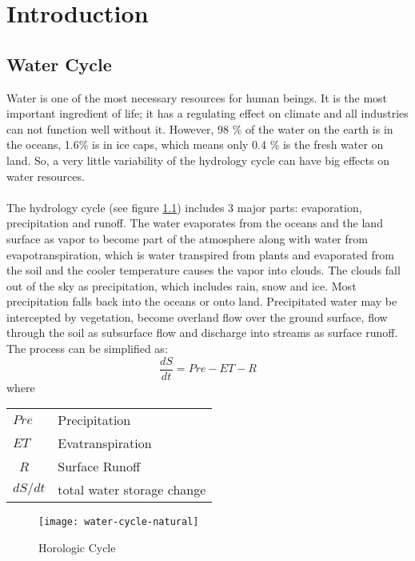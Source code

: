 \chapter{Introduction}
\section{Water Cycle}
Water is one of the most necessary resources for human beings. It is the most important ingredient of life; it has a regulating effect on climate and all industries can not function well without it. However, 98 \%
of the water on the earth is in the oceans, 1.6\% is in ice caps, which means only 0.4 \% is the
fresh water on land. So, a very little variability of the hydrology cycle can have big effects on
water resources. \\\\
The hydrology cycle (see figure \ref{fig:hydrologic cycle}) includes 3 major parts: evaporation, precipitation and runoff. The water evaporates from the oceans and the land surface as vapor to become part of the atmosphere along with water from evapotranspiration, which is water transpired from plants and evaporated from the soil and the cooler temperature causes the vapor into clouds. The clouds fall out of the sky as precipitation, which includes rain, snow and ice. Most precipitation falls back into the oceans or onto land. Precipitated water may be intercepted by vegetation, become overland flow over the ground surface, flow through the soil as subsurface flow and discharge into streams as surface runoff. The process can be simplified as:
\begin{equation}
	\frac{dS}{dt} = Pre - ET - R
\end{equation}
where
\begin{table}[htbp]
	\begin{tabular}{ll}
		$Pre$   & Precipitation    \\ 
		$ET$    & Evatranspiration \\ \
		$R$     & Surface Runoff \\ 
		$dS / dt$ & total water storage change \\ 
	\end{tabular}
\end{table}
\begin{figure}[htbp]
	\centering
	\texttt{[image: water-cycle-natural]} %
	\caption{Horologic Cycle} 
	\label{fig:hydrologic cycle}
\end{figure}
